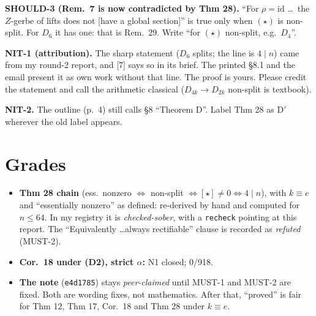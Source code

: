 \documentclass[10pt]{article}
\begin{document}
\textbf{SHOULD-3 (Rem.~7 is now contradicted by Thm 28).} ``For $\rho=\mathrm{id}$ \dots\ the $Z$-gerbe of lifts does not [have a global section]'' is true only when $(\star)$ is non-split. For $D_6$ it has one: that is Rem.~29. Write ``for $(\star)$ non-split, e.g.\ $D_4$''.

\textbf{NIT-1 (attribution).} The sharp statement ($D_6$ splits; the line is $4\mid n$) came from my round-2 report, and [7] says so in its brief. The printed \S8.1 and the email present it as own work without that line. The proof is yours. Please credit the statement and call the arithmetic classical ($D_{4k}\to D_{2k}$ non-split is textbook).

\textbf{NIT-2.} The outline (p.~4) still calls \S8 ``Theorem D''. Label Thm 28 as D$'$ wherever the old label appears.

\section{Grades}
\begin{itemize}
\item \textbf{Thm 28 chain} (ess.\ nonzero $\iff$ non-split $\iff[\star]\neq0\iff4\mid n$), with $k\equiv e$ and ``essentially nonzero'' as defined: re-derived by hand and computed for $n\le64$. In my registry it is \emph{checked-sober}, with a \texttt{recheck} pointing at this report. The ``Equivalently \dots always rectifiable'' clause is recorded as \emph{refuted} (MUST-2).
\item \textbf{Cor.~18 under (D2), strict $\alpha$:} N1 closed; 0/918.
\item \textbf{The note} (\texttt{e4d1785}) stays \emph{peer-claimed} until MUST-1 and MUST-2 are fixed. Both are wording fixes, not mathematics. After that, ``proved'' is fair for Thm 12, Thm 17, Cor.~18 and Thm 28 under $k\equiv e$.
\end{itemize}
\end{document}
